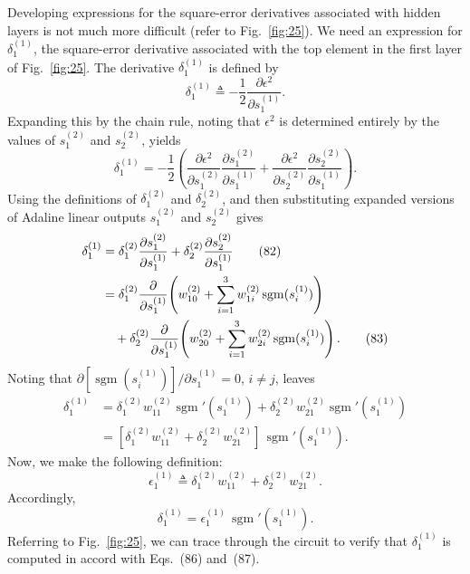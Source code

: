 \documentclass[10pt,twocolumn]{article}
\newcommand{\sgm}{\operatorname{sgm}}
\begin{document}
Developing expressions for the square-error derivatives associated with hidden
layers is not much more difficult (refer to Fig.~\ref{fig:25}). We need an
expression for $\delta_1^{(1)}$, the square-error derivative associated with the top
element in the first layer of Fig.~\ref{fig:25}. The derivative $\delta_1^{(1)}$ is
defined by
\begin{equation}
\delta_1^{(1)} \triangleq -\frac{1}{2}\frac{\partial\epsilon^2}{\partial s_1^{(1)}}. \tag{80}
\end{equation}
Expanding this by the chain rule, noting that $\epsilon^2$ is determined entirely by
the values of $s_1^{(2)}$ and $s_2^{(2)}$, yields
\begin{equation}
\delta_1^{(1)} = -\frac{1}{2}\!\left(\frac{\partial\epsilon^2}{\partial s_1^{(2)}}\frac{\partial s_1^{(2)}}{\partial s_1^{(1)}}
+ \frac{\partial\epsilon^2}{\partial s_2^{(2)}}\frac{\partial s_2^{(2)}}{\partial s_1^{(1)}}\right). \tag{81}
\end{equation}
Using the definitions of $\delta_1^{(2)}$ and $\delta_2^{(2)}$, and then
substituting expanded versions of Adaline linear outputs $s_1^{(2)}$ and
$s_2^{(2)}$ gives
\begin{align}
\delta_1^{(1)} &= \delta_1^{(2)}\frac{\partial s_1^{(2)}}{\partial s_1^{(1)}}
+ \delta_2^{(2)}\frac{\partial s_2^{(2)}}{\partial s_1^{(1)}} \tag{82}\\
&= \delta_1^{(2)}\frac{\partial}{\partial s_1^{(1)}}\!\left(w_{10}^{(2)} + \sum_{i=1}^{3}w_{1i}^{(2)}\sgm(s_i^{(1)})\right)\notag\\
&\quad + \delta_2^{(2)}\frac{\partial}{\partial s_1^{(1)}}\!\left(w_{20}^{(2)} + \sum_{i=1}^{3}w_{2i}^{(2)}\sgm(s_i^{(1)})\right). \tag{83}
\end{align}
Noting that $\partial[\sgm(s_i^{(1)})]/\partial s_1^{(1)} = 0$, $i \neq j$, leaves
\begin{align}
\delta_1^{(1)} &= \delta_1^{(2)}w_{11}^{(2)}\sgm'(s_1^{(1)}) + \delta_2^{(2)}w_{21}^{(2)}\sgm'(s_1^{(1)}) \tag{84}\\
&= [\delta_1^{(2)}w_{11}^{(2)} + \delta_2^{(2)}w_{21}^{(2)}]\,\sgm'(s_1^{(1)}). \tag{85}
\end{align}
Now, we make the following definition:
\begin{equation}
\epsilon_1^{(1)} \triangleq \delta_1^{(2)}w_{11}^{(2)} + \delta_2^{(2)}w_{21}^{(2)}. \tag{86}
\end{equation}
Accordingly,
\begin{equation}
\delta_1^{(1)} = \epsilon_1^{(1)}\,\sgm'(s_1^{(1)}). \tag{87}
\end{equation}
Referring to Fig.~\ref{fig:25}, we can trace through the circuit to verify that
$\delta_1^{(1)}$ is computed in accord with Eqs.~(86) and~(87).
\end{document}
